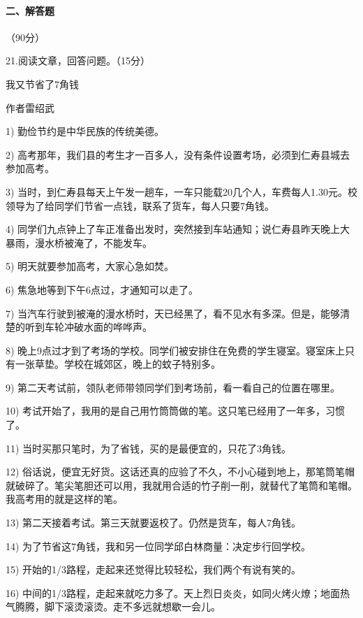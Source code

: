 \documentclass[UTF8,12pt,oneside]{ctexbook}
\begin{document}
    \paragraph{二、解答题}（90分）
    
    21.阅读文章，回答问题。（15分）
    
    \begin{center}
        \large\kaishu
        我又节省了7角钱
        \songti\normalsize
        
        作者\qquad 雷绍武
    \end{center}
    
    \fangsong
    {
    1) 勤俭节约是中华民族的传统美德。
    
    2) 高考那年，我们县的考生才一百多人，没有条件设置考场，必须到仁寿县城去参加高考。
    
    3) 当时，到仁寿县每天上午发一趟车，一车只能载20几个人，车费每人1.30元。校领导为了给同学们节省一点钱，联系了货车，每人只要7角钱。
    
    4) 同学们九点钟上了车正准备出发时，突然接到车站通知；说仁寿县昨天晚上大暴雨，漫水桥被淹了，不能发车。
    
    5) 明天就要参加高考，大家心急如焚。
    
    6) 焦急地等到下午6点过，才通知可以走了。
    
    7) 当汽车行驶到被淹的漫水桥时，天已经黑了，看不见水有多深。但是，能够清楚的听到车轮冲破水面的哗哗声。
    
    8) 晚上9点过才到了考场的学校。同学们被安排住在免费的学生寝室。寝室床上只有一张草垫。学校在城郊区，晚上的蚊子特别多。
    
    9) 第二天考试前，领队老师带领同学们到考场前，看一看自己的位置在哪里。
    
    10) 考试开始了，我用的是自己用竹筒筒做的笔。这只笔已经用了一年多，习惯了。
    
    11) 当时买那只笔时，为了省钱，买的是最便宜的，只花了3角钱。
    
    12) 俗话说，便宜无好货。这话还真的应验了不久，不小心碰到地上，那笔筒笔帽就破碎了。笔尖笔胆还可以用，我就用合适的竹子削一削，就替代了笔筒和笔帽。我高考用的就是这样的笔。
    
    13) 第二天接着考试。第三天就要返校了。仍然是货车，每人7角钱。
    
    14) 为了节省这7角钱，我和另一位同学邱白林商量：决定步行回学校。
    
    15) 开始的1/3路程，走起来还觉得比较轻松，我们两个有说有笑的。
    
    16) 中间的1/3路程，走起来就吃力多了。天上烈日炎炎，如同火烤火燎；地面热气腾腾，脚下滚烫滚烫。走不多远就想歇一会儿。
    
}
\end{document}
